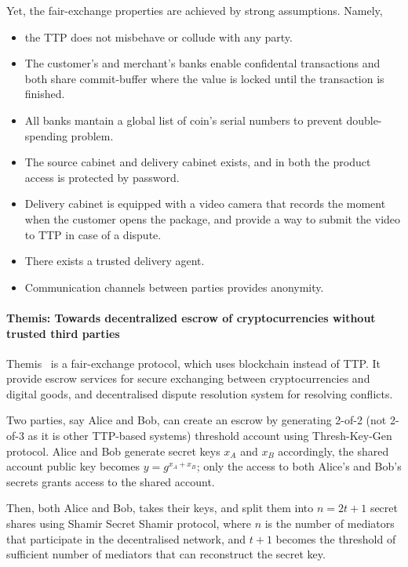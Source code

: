 \documentclass{ieeeaccess}
\begin{document}
Yet, the fair-exchange properties are achieved by strong assumptions.
Namely,

\begin{itemize}
    \item the TTP does not misbehave or collude with any party. 
    \item The customer's and merchant's banks enable confidental transactions and both share commit-buffer where the value is locked until the transaction is finished.   
    \item All banks mantain a global list of coin's serial numbers to prevent double-spending problem. 
    \item The source cabinet and delivery cabinet exists, and in both the product access is protected by password.
    \item Delivery cabinet is equipped with a video camera that records the moment when the customer opens the package, and provide a way to submit the video to TTP in case of a dispute. 
    \item There exists a trusted delivery agent.
    \item Communication channels between parties provides anonymity.
\end{itemize}

\paragraph{Themis: Towards decentralized escrow of cryptocurrencies
without trusted third
parties}\label{themis-towards-decentralized-escrow-of-cryptocurrencies-without-trusted-third-parties}

Themis~\cite{meng2019themis} is a fair-exchange
protocol, which uses blockchain instead of TTP. It provide escrow
services for secure exchanging between cryptocurrencies and digital goods, and decentralised dispute resolution system for resolving conflicts.

Two parties, say Alice and Bob, can create an escrow by generating
2-of-2 (not 2-of-3 as it is other TTP-based systems) threshold account
using Thresh-Key-Gen protocol. Alice and Bob generate secret keys
\(x_A\) and \(x_B\) accordingly, the shared account public key becomes
\(y = g^{x_A+x_B}\); only the access to both Alice's and Bob's secrets
grants access to the shared account.

Then, both Alice and Bob, takes their keys, and split them into
\(n=2t+1\) secret shares using Shamir Secret Shamir protocol, where
\(n\) is the number of mediators that participate in the decentralised
network, and \(t+1\) becomes the threshold of sufficient number of
mediators that can reconstruct the secret key.
\end{document}
